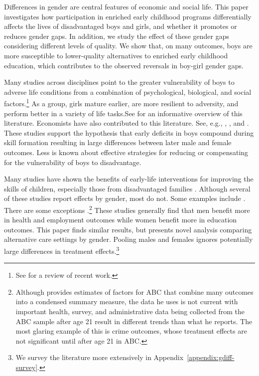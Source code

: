 Differences in gender are central features of economic and social life. This paper investigates how participation in enriched early childhood programs differentially affects the lives of disadvantaged boys and girls, and whether it promotes or reduces gender gaps. In addition, we study the effect of these gender gaps considering different levels of quality. We show that, on many outcomes, boys are more susceptible to lower-quality alternatives to enriched early childhood education, which contributes to the observed reversals in boy-girl gender gaps. 

Many studies across disciplines point to the greater vulnerability of boys to adverse life conditions from a combination of psychological, biological, and social factors.\footnote{See \citet{Golding_Fitzgerald_2017_IMHJ} for a review of recent work.} As a group, girls mature earlier, are more resilient to adversity, and perform better in a variety of life tasks.See \citet{Eliot_Brain_2009_BOOKSchore_2017_IMHJ} for an informative overview of this literature. Economists have also contributed to this literature. See, e.g., \citet{Bertrand_Pan_2013_AEJAE}, \citet{Kottelenberg_Lehrer_2014_Gender-Effects}, and \citet{Autor-etal_2015_Family-Disadvantage}. These studies support the hypothesis that early deficits in boys compound during skill formation resulting in large differences between later male and female outcomes. Less is known about effective strategies for reducing or compensating for the vulnerability of boys to disadvantage.

Many studies have shown the benefits of early-life interventions for improving the skills of children, especially those from disadvantaged families \citep{Currie_2011_AER,Elango_Hojman_etal_2016_Early-Edu}. Although several of these studies report effects by gender, most do not. Some examples include \citet{Bernal_Keane_2011_JoLE,Cascio_Schanzenbach_2013_ImpactsExpandingAccess,Bitler_et_al_2014_Head_Start_Unpublished,Kline_Walters_2016_QJE}. There are some exceptions \citep{Anderson_2008_JASA,Heckman_Moon_etal_2010_QE,Campbell_Conti_etal_2014_EarlyChildhoodInvestments,Garcia_Heckman_Leaf_etal_2017_Comp_CBA_Unpublished}.\footnote{Although \citet{Anderson_2008_JASA} provides estimates of factors for ABC that combine many outcomes into a condensed summary measure, the data he uses is not current with important health, survey, and administrative data being collected from the ABC sample after age 21 result in different trends than what he reports. The most glaring example of this is crime outcomes, whose treatment effects are not significant until after age 21 in ABC.} These studies generally find that men benefit more in health and employment outcomes while women benefit more in education outcomes. This paper finds similar results, but presents novel analysis comparing alternative care settings by gender. Pooling males and females ignores potentially large differences in treatment effects.\footnote{We survey the literature more extensively in Appendix~\ref{appendix:gdiff-survey}.} 

